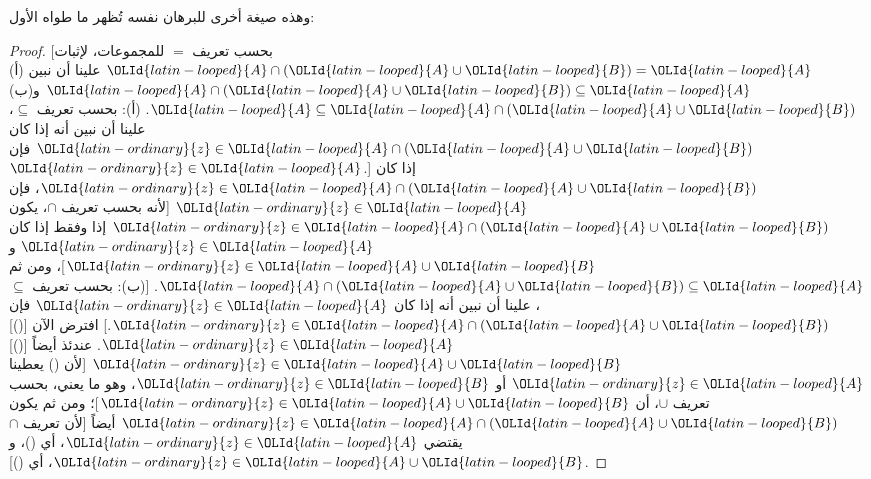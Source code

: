 \documentclass[../../../include/open-logic-section]{subfiles}
\begin{document}
وهذه صيغة أخرى للبرهان نفسه تُظهر ما طواه الأول:
\begin{proof}{}
[بحسب تعريف $=$ للمجموعات، لإثبات $\OLId{latin-looped}{A} \cap (\OLId{latin-looped}{A} \cup \OLId{latin-looped}{B}) = \OLId{latin-looped}{A}$ علينا أن
  نبين (أ) $\OLId{latin-looped}{A} \cap (\OLId{latin-looped}{A} \cup \OLId{latin-looped}{B}) \subseteq \OLId{latin-looped}{A}$ و(ب)
  $\OLId{latin-looped}{A} \subseteq \OLId{latin-looped}{A} \cap (\OLId{latin-looped}{A} \cup \OLId{latin-looped}{B})$. (أ): بحسب تعريف $\subseteq$، علينا
  أن نبين أنه إذا كان $\OLId{latin-ordinary}{z} \in \OLId{latin-looped}{A} \cap (\OLId{latin-looped}{A} \cup \OLId{latin-looped}{B})$ فإن $\OLId{latin-ordinary}{z} \in \OLId{latin-looped}{A}$.]
إذا كان $\OLId{latin-ordinary}{z} \in \OLId{latin-looped}{A} \cap (\OLId{latin-looped}{A} \cup \OLId{latin-looped}{B})$، فإن $\OLId{latin-ordinary}{z} \in \OLId{latin-looped}{A}$ [لأنه بحسب تعريف
$\cap$، يكون $\OLId{latin-ordinary}{z} \in \OLId{latin-looped}{A} \cap (\OLId{latin-looped}{A} \cup \OLId{latin-looped}{B})$ إذا وفقط إذا كان $\OLId{latin-ordinary}{z} \in \OLId{latin-looped}{A}$
و$\OLId{latin-ordinary}{z} \in \OLId{latin-looped}{A} \cup \OLId{latin-looped}{B}$]، ومن ثم $\OLId{latin-looped}{A} \cap (\OLId{latin-looped}{A} \cup \OLId{latin-looped}{B}) \subseteq \OLId{latin-looped}{A}$.
[(ب): بحسب تعريف $\subseteq$، علينا أن نبين أنه إذا كان $\OLId{latin-ordinary}{z} \in \OLId{latin-looped}{A}$ فإن
$\OLId{latin-ordinary}{z} \in \OLId{latin-looped}{A} \cap (\OLId{latin-looped}{A} \cup \OLId{latin-looped}{B})$.] افترض الآن [()] $\OLId{latin-ordinary}{z} \in \OLId{latin-looped}{A}$. عندئذ أيضاً
[()] $\OLId{latin-ordinary}{z} \in \OLId{latin-looped}{A} \cup \OLId{latin-looped}{B}$ [لأن () يعطينا $\OLId{latin-ordinary}{z} \in \OLId{latin-looped}{A}$ أو $\OLId{latin-ordinary}{z} \in \OLId{latin-looped}{B}$،
وهو ما يعني، بحسب تعريف $\cup$، أن $\OLId{latin-ordinary}{z} \in \OLId{latin-looped}{A} \cup \OLId{latin-looped}{B}$]؛ ومن ثم يكون
$\OLId{latin-ordinary}{z} \in \OLId{latin-looped}{A} \cap (\OLId{latin-looped}{A} \cup \OLId{latin-looped}{B})$ أيضاً [لأن تعريف $\cap$ يقتضي
$\OLId{latin-ordinary}{z} \in \OLId{latin-looped}{A}$، أي ()، و$\OLId{latin-ordinary}{z} \in \OLId{latin-looped}{A} \cup \OLId{latin-looped}{B}$، أي ()].
\end{proof}
\end{document}
